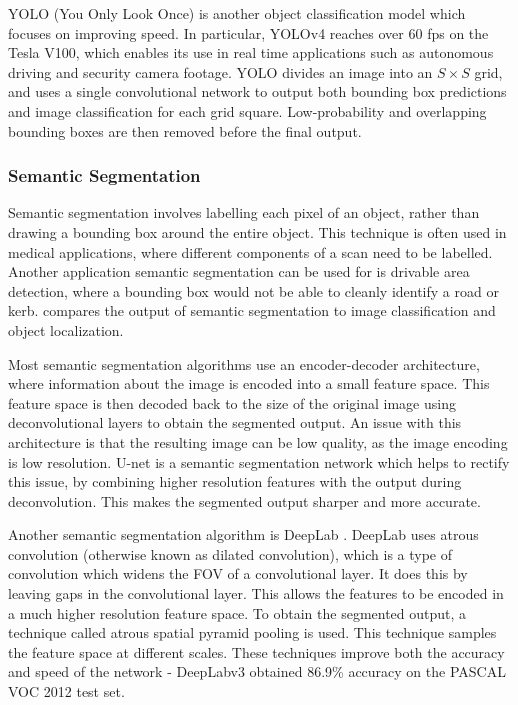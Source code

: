 \documentclass[12pt]{article}
\begin{document}
YOLO (You Only Look Once) \cite{redmonYouOnlyLook2015}\cite{redmonYOLO9000BetterFaster2016}\cite{redmonYOLOv3IncrementalImprovement2018}\cite{bochkovskiyYOLOv4OptimalSpeed2020}
is another object classification model which focuses on improving speed. In particular, YOLOv4 \cite{bochkovskiyYOLOv4OptimalSpeed2020}
reaches over 60 fps on the Tesla V100, which enables its use in real time applications such as autonomous driving and security camera footage. %
YOLO divides an image into an $S\times S$ grid, and uses a single convolutional network to output both bounding box predictions and
image classification for each grid square. Low-probability and overlapping bounding boxes are then removed before the final output.

\subsubsection{Semantic Segmentation}
Semantic segmentation involves labelling each pixel of an object, rather than drawing a bounding box around the entire object.
This technique is often used in medical applications, where different components of a scan need to be labelled.
Another application semantic segmentation can be used for is drivable area detection, where a bounding box would not be able to cleanly
identify a road or kerb.  compares the output of semantic segmentation to image classification and object localization.

Most semantic segmentation algorithms use an encoder-decoder architecture, where information about the image is encoded into a small feature space.
This feature space is then decoded back to the size of the original image using deconvolutional layers to obtain the segmented output.
An issue with this architecture is that the resulting image can be low quality, as the image encoding is low resolution.
U-net \cite{ronnebergerUNetConvolutionalNetworks2015} is a semantic segmentation network which helps to rectify this issue,
by combining higher resolution features with the output during deconvolution.
This makes the segmented output sharper and more accurate.

Another semantic segmentation algorithm is DeepLab \cite{chenSemanticImageSegmentation2014}\cite{chenDeepLabSemanticImage2016}\cite{chenRethinkingAtrousConvolution2017}.
DeepLab uses atrous convolution (otherwise known as dilated convolution), which is a type of convolution which widens the FOV of a convolutional layer.
It does this by leaving gaps in the convolutional layer. This allows the features to be encoded in a much higher resolution feature space.
To obtain the segmented output, a technique called atrous spatial pyramid pooling is used. This technique samples the feature space at different
scales.
These techniques improve both the accuracy and speed of the network - DeepLabv3 obtained 86.9\% accuracy on the PASCAL VOC 2012 test set.
\end{document}

